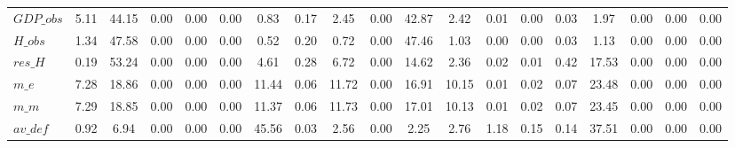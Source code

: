 \begin{center}
\begin{longtable}{lcccccccccccccccccc}
$GDP\_obs           $	 & 	             5.11	 & 	            44.15	 & 	             0.00	 & 	             0.00	 & 	             0.00	 & 	             0.83	 & 	             0.17	 & 	             2.45	 & 	             0.00	 & 	            42.87	 & 	             2.42	 & 	             0.01	 & 	             0.00	 & 	             0.03	 & 	             1.97	 & 	             0.00	 & 	             0.00	 & 	             0.00 \\ 
$H\_obs             $	 & 	             1.34	 & 	            47.58	 & 	             0.00	 & 	             0.00	 & 	             0.00	 & 	             0.52	 & 	             0.20	 & 	             0.72	 & 	             0.00	 & 	            47.46	 & 	             1.03	 & 	             0.00	 & 	             0.00	 & 	             0.03	 & 	             1.13	 & 	             0.00	 & 	             0.00	 & 	             0.00 \\ 
$res\_H             $	 & 	             0.19	 & 	            53.24	 & 	             0.00	 & 	             0.00	 & 	             0.00	 & 	             4.61	 & 	             0.28	 & 	             6.72	 & 	             0.00	 & 	            14.62	 & 	             2.36	 & 	             0.02	 & 	             0.01	 & 	             0.42	 & 	            17.53	 & 	             0.00	 & 	             0.00	 & 	             0.00 \\ 
$m\_e               $	 & 	             7.28	 & 	            18.86	 & 	             0.00	 & 	             0.00	 & 	             0.00	 & 	            11.44	 & 	             0.06	 & 	            11.72	 & 	             0.00	 & 	            16.91	 & 	            10.15	 & 	             0.01	 & 	             0.02	 & 	             0.07	 & 	            23.48	 & 	             0.00	 & 	             0.00	 & 	             0.00 \\ 
$m\_m               $	 & 	             7.29	 & 	            18.85	 & 	             0.00	 & 	             0.00	 & 	             0.00	 & 	            11.37	 & 	             0.06	 & 	            11.73	 & 	             0.00	 & 	            17.01	 & 	            10.13	 & 	             0.01	 & 	             0.02	 & 	             0.07	 & 	            23.45	 & 	             0.00	 & 	             0.00	 & 	             0.00 \\ 
$av\_def            $	 & 	             0.92	 & 	             6.94	 & 	             0.00	 & 	             0.00	 & 	             0.00	 & 	            45.56	 & 	             0.03	 & 	             2.56	 & 	             0.00	 & 	             2.25	 & 	             2.76	 & 	             1.18	 & 	             0.15	 & 	             0.14	 & 	            37.51	 & 	             0.00	 & 	             0.00	 & 	             0.00 \\ 

\end{longtable}
\end{center}
